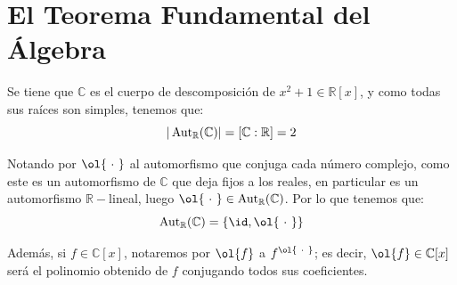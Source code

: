\section{El Teorema Fundamental del Álgebra}
\noindent
Se tiene que $\mathbb{C}$ es el cuerpo de descomposición de $x^2+1\in \mathbb{R}[x]$, y como todas sus raíces son simples, tenemos que:
\begin{equation*}
    |\operatorname{Aut}_\mathbb{R}(\mathbb{C})| = [\mathbb{C}:\mathbb{R}] = 2
\end{equation*}

Notando por $\ol{\ \cdot\ }$ al automorfismo que conjuga cada número complejo, como este es un automorfismo de $\mathbb{C}$ que deja fijos a los reales, en particular es un automorfismo $\mathbb{R}-$lineal, luego $\ol{\ \cdot\ }\in \Aut_\mathbb{R}(\mathbb{C})$. Por lo que tenemos que:
\begin{equation*}
    \Aut_\mathbb{R}(\mathbb{C}) = \{\id, \ol{\ \cdot\ }\}
\end{equation*}

\noindent
Además, si $f\in \mathbb{C}[x]$, notaremos por $\ol{f}$ a $f^{\ol{\ \cdot\ }}$; es decir, $\ol{f}\in \mathbb{C}[x]$ será el polinomio obtenido de $f$ conjugando todos sus coeficientes.


